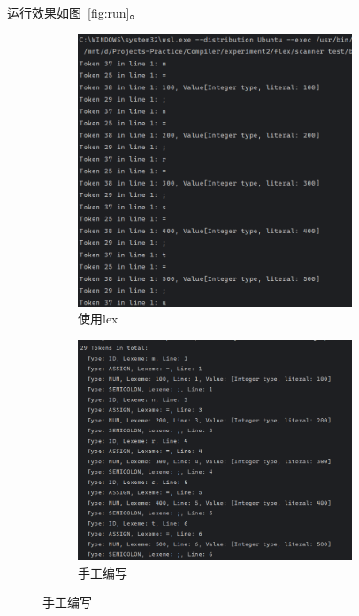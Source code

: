 \documentclass[a4paper,twoside]{article}
\begin{document}
\begin{spacing}{1.2}
运行效果如图~\ref{fig:run}。
\begin{figure}[htb]
	\centering
	\caption{运行结果}
	\label{fig:run}
	\begin{subfigure}[b]{0.4\textwidth}
		\centering
		\includegraphics[width=0.9\textwidth]{images/lex.png}
		\caption{使用lex}
	\end{subfigure}
	\begin{subfigure}[b]{0.4\textwidth}
		\centering
		\includegraphics[width=0.9\textwidth]{images/byhand.png}
		\caption{手工编写}
	\end{subfigure}
\end{figure}


\end{spacing}
\end{document}
